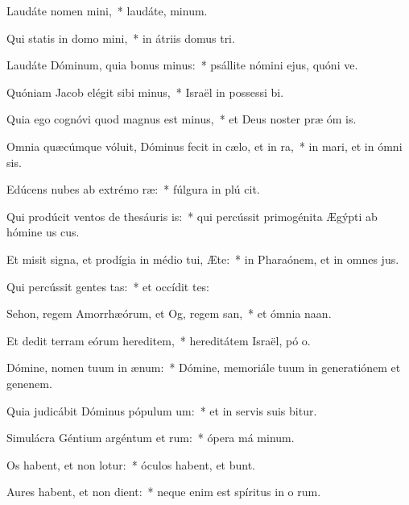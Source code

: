 \item Laudáte nomen mini,~* laudáte,  minum.
\item Qui statis in domo mini,~* in átriis domus  tri.
\item Laudáte Dóminum, quia bonus minus:~* psállite nómini ejus, quóni ve.
\item Quóniam Jacob elégit sibi minus,~* Israël in possessi bi.
\item Quia ego cognóvi quod magnus est minus,~* et Deus noster præ óm is.
\item Omnia quæcúmque vóluit, Dóminus fecit in cælo, et in ra,~* in mari, et in ómni sis.
\item Edúcens nubes ab extrémo ræ:~* fúlgura in plú cit.
\item Qui prodúcit ventos de thesáuris is:~* qui percússit primogénita Ægýpti ab hómine us  cus.
\item Et misit signa, et prodígia in médio tui, Æte:~* in Pharaónem, et in omnes  jus.
\item Qui percússit gentes tas:~* et occídit  tes:
\item Sehon, regem Amorrhæórum, et Og, regem san,~* et ómnia  naan.
\item Et dedit terram eórum hereditem,~* hereditátem Israël, pó o.
\item Dómine, nomen tuum in ænum:~* Dómine, memoriále tuum in generatiónem et genenem.
\item Quia judicábit Dóminus pópulum um:~* et in servis suis bitur.
\item Simulácra Géntium argéntum et rum:~* ópera má minum.
\item Os habent, et non lotur:~* óculos habent, et  bunt.
\item Aures habent, et non dient:~* neque enim est spíritus in o rum.

